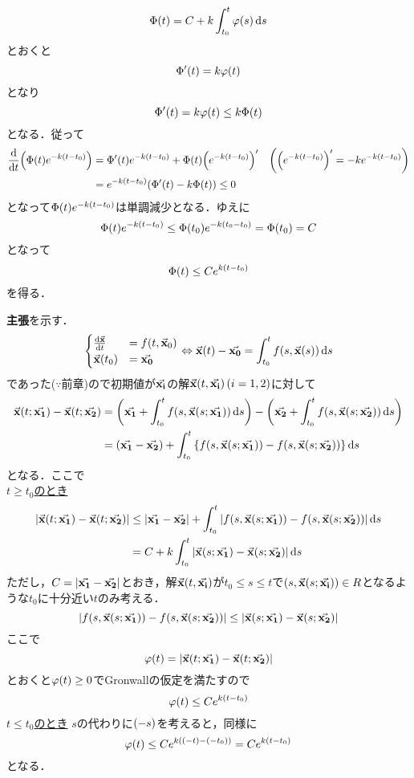 \documentclass[autodetect-engine,dvipdfmx-if-dvi,ja=standard]{bxjsarticle}
\makeatletter
\theoremstyle{mystyle1}
\theoremstyle{mystyle2}
\renewenvironment{proof}[1][\proofname]{\par
  \pushQED{\qed}%
  \normalfont
  \topsep6\p@\@plus6\p@ \trivlist
  \item[\hskip\labelsep{\bfseries\sffamily #1}]\ignorespaces
}{%
  \popQED\endtrivlist\@endpefalse
}
\renewcommand\proofname{\ensuremath{\because}}
\makeatother
\begin{document}
\begin{proof}
  \[\Phi\qty(t)=C+k\int_{t_0}^t\varphi\qty(s)\dd{s}\]
  とおくと
  \[\Phi^\prime\qty(t)=k\varphi\qty(t)\]
  となり
  \[\Phi^\prime\qty(t)=k\varphi\qty(t)\leq k\Phi\qty(t)\]
  となる．従って
  \begin{align*}
    \dv{t}\qty(\Phi\qty(t)e^{-k\qty(t-t_0)})
     & =\Phi^\prime\qty(t)e^{-k\qty(t-t_0)}+\Phi\qty(t)\qty(e^{-k\qty(t-t_0)})^\prime & \qty(\qty(e^{-k\qty(t-t_0)})^\prime=-ke^{-k\qty(t-t_0)}) \\
     & =e^{-k\qty(t-t_0)}\qty(\Phi^\prime\qty(t)-k\Phi\qty(t))\leq 0
  \end{align*}
  となって$\Phi\qty(t)e^{-k\qty(t-t_0)}$は単調減少となる．ゆえに\[\Phi\qty(t)e^{-k\qty(t-t_0)}\leq\Phi\qty(t_0)e^{-k\qty(t_0-t_0)}=\Phi\qty(t_0)=C\]
  となって
  \[\Phi\qty(t)\leq Ce^{k\qty(t-t_0)}\]
  を得る．

  \textbf{主張}を示す．
  \begin{align*}
    \begin{cases}
      \dv{\va{x}}{t}  & =f\qty(t,\va{x}_0) \\
      \va{x}\qty(t_0) & =\va{x_0}
    \end{cases}\Leftrightarrow
    \va{x}\qty(t)-\va{x_0}=\int_{t_0}^tf\qty(s,\va{x}\qty(s))\dd{s}
  \end{align*}
  であった($\because $前章)ので初期値が$\va{x_i}$の解$\va{x}\qty(t,\va{x_i})\,\qty(i=1,2)$に対して
  \begin{align*}
    \va{x}\qty(t;\va{x_1})-\va{x}\qty(t;\va{x_2})
     & =\qty(\va{x_1}+\int_{t_0}^tf\qty(s,\va{x}\qty(s;\va{x_1}))\dd{s})-\qty(\va{x_2}+\int_{t_0}^tf\qty(s,\va{x}\qty(s;\va{x_2}))\dd{s}) \\
     & =\qty(\va{x_1}-\va{x_2})+\int_{t_0}^t\qty{f\qty(s,\va{x}\qty(s;\va{x_1}))-f\qty(s,\va{x}\qty(s;\va{x_2}))}\dd{s}
  \end{align*}
  となる．ここで\\
  \underline{$t\geq t_0$のとき}
  \begin{align*}
    \qty|\va{x}\qty(t;\va{x_1})-\va{x}\qty(t;\va{x_2})|
     & \leq\qty|\va{x_1}-\va{x_2}|+\int_{t_0}^t\qty|f\qty(s,\va{x}\qty(s;\va{x_1}))-f\qty(s,\va{x}\qty(s;\va{x_2}))|\dd{s} \\
     & =C+k\int_{t_0}^t\qty|\va{x}\qty(s;\va{x_1})-\va{x}\qty(s;\va{x_2})|\dd{s}
  \end{align*}
  ただし，$C=\qty|\va{x_1}-\va{x_2}|$とおき，解$\va{x}\qty(t,\va{x_i})$が$t_0\leq s\leq t$で$\qty(s,\va{x}\qty(s;\va{x_i}))\in R$となるような$t_0$に十分近い$t$のみ考える．
  \[\qty|f\qty(s,\va{x}\qty(s;\va{x_1}))-f\qty(s,\va{x}\qty(s;\va{x_2}))|\leq \qty|\va{x}\qty(s;\va{x_1})-\va{x}\qty(s;\va{x_2})|\]
  ここで
  \[\varphi\qty(t)=\qty|\va{x}\qty(t;\va{x_1})-\va{x}\qty(t;\va{x_2})|\]
  とおくと$\varphi\qty(t)\geq 0$でGronwallの仮定を満たすので
  \[\varphi\qty(t)\leq Ce^{k\qty(t-t_0)}\]
  \underline{$t\leq t_0$のとき}
  $s$の代わりに$\qty(-s)$を考えると，同様に
  \[\varphi\qty(t)\leq Ce^{k\qty(\qty(-t)-\qty(-t_0))}=Ce^{k\qty(t-t_0)}\]
  となる．


\end{proof}
\end{document}
